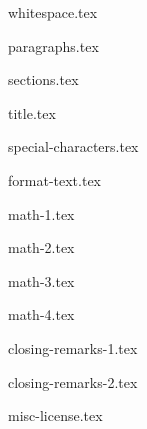 \documentclass[allauthors]{../../cursuspresentatie}
\def\importslide#1#2{%
	{#2}
}
\begin{document}
\importslide{beginners}{whitespace.tex}

\importslide{beginners}{paragraphs.tex}



\importslide{beginners}{sections.tex}
\importslide{beginners}{title.tex}


\importslide{beginners}{special-characters.tex}

\importslide{beginners}{format-text.tex}


\importslide{beginners}{math-1.tex}

\importslide{beginners}{math-2.tex}


\importslide{beginners}{math-3.tex}

\importslide{beginners}{math-4.tex}


\importslide{beginners}{closing-remarks-1.tex}
\importslide{beginners}{closing-remarks-2.tex}

	
\importslide{misc}{misc-license.tex}
\end{document}
